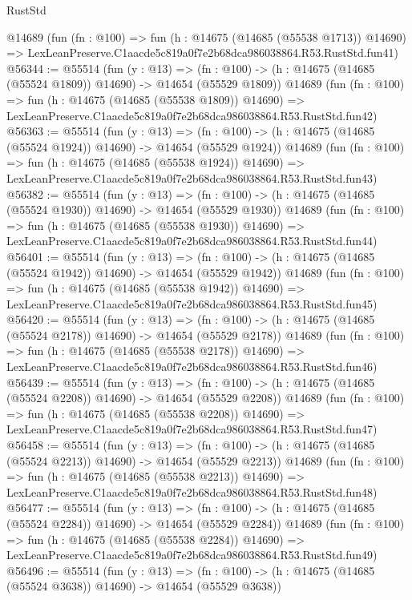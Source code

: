 \begin{lexlean}{RustStd}
\begin{coremodule}
    @14689
    (fun (fn : @100) =>
    fun (h : @14675 (@14685 (@55538 @1713)) @14690) =>
    LexLeanPreserve.C1aacde5c819a0f7e2b68dca986038864.R53.RustStd.fun41)
@56344 := @55514
    (fun (y : @13) =>
    (fn : @100) -> (h : @14675 (@14685 (@55524 @1809)) @14690) -> @14654 (@55529 @1809))
    @14689
    (fun (fn : @100) =>
    fun (h : @14675 (@14685 (@55538 @1809)) @14690) =>
    LexLeanPreserve.C1aacde5c819a0f7e2b68dca986038864.R53.RustStd.fun42)
@56363 := @55514
    (fun (y : @13) =>
    (fn : @100) -> (h : @14675 (@14685 (@55524 @1924)) @14690) -> @14654 (@55529 @1924))
    @14689
    (fun (fn : @100) =>
    fun (h : @14675 (@14685 (@55538 @1924)) @14690) =>
    LexLeanPreserve.C1aacde5c819a0f7e2b68dca986038864.R53.RustStd.fun43)
@56382 := @55514
    (fun (y : @13) =>
    (fn : @100) -> (h : @14675 (@14685 (@55524 @1930)) @14690) -> @14654 (@55529 @1930))
    @14689
    (fun (fn : @100) =>
    fun (h : @14675 (@14685 (@55538 @1930)) @14690) =>
    LexLeanPreserve.C1aacde5c819a0f7e2b68dca986038864.R53.RustStd.fun44)
@56401 := @55514
    (fun (y : @13) =>
    (fn : @100) -> (h : @14675 (@14685 (@55524 @1942)) @14690) -> @14654 (@55529 @1942))
    @14689
    (fun (fn : @100) =>
    fun (h : @14675 (@14685 (@55538 @1942)) @14690) =>
    LexLeanPreserve.C1aacde5c819a0f7e2b68dca986038864.R53.RustStd.fun45)
@56420 := @55514
    (fun (y : @13) =>
    (fn : @100) -> (h : @14675 (@14685 (@55524 @2178)) @14690) -> @14654 (@55529 @2178))
    @14689
    (fun (fn : @100) =>
    fun (h : @14675 (@14685 (@55538 @2178)) @14690) =>
    LexLeanPreserve.C1aacde5c819a0f7e2b68dca986038864.R53.RustStd.fun46)
@56439 := @55514
    (fun (y : @13) =>
    (fn : @100) -> (h : @14675 (@14685 (@55524 @2208)) @14690) -> @14654 (@55529 @2208))
    @14689
    (fun (fn : @100) =>
    fun (h : @14675 (@14685 (@55538 @2208)) @14690) =>
    LexLeanPreserve.C1aacde5c819a0f7e2b68dca986038864.R53.RustStd.fun47)
@56458 := @55514
    (fun (y : @13) =>
    (fn : @100) -> (h : @14675 (@14685 (@55524 @2213)) @14690) -> @14654 (@55529 @2213))
    @14689
    (fun (fn : @100) =>
    fun (h : @14675 (@14685 (@55538 @2213)) @14690) =>
    LexLeanPreserve.C1aacde5c819a0f7e2b68dca986038864.R53.RustStd.fun48)
@56477 := @55514
    (fun (y : @13) =>
    (fn : @100) -> (h : @14675 (@14685 (@55524 @2284)) @14690) -> @14654 (@55529 @2284))
    @14689
    (fun (fn : @100) =>
    fun (h : @14675 (@14685 (@55538 @2284)) @14690) =>
    LexLeanPreserve.C1aacde5c819a0f7e2b68dca986038864.R53.RustStd.fun49)
@56496 := @55514
    (fun (y : @13) =>
    (fn : @100) -> (h : @14675 (@14685 (@55524 @3638)) @14690) -> @14654 (@55529 @3638))

\end{coremodule}
\end{lexlean}
